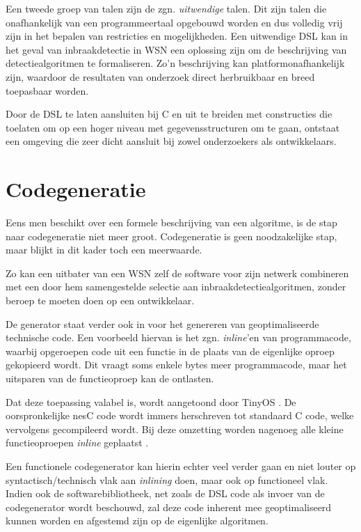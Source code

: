 Een tweede groep van talen zijn de zgn. \emph{uitwendige} talen. Dit zijn talen
die onafhankelijk van een programmeertaal opgebouwd worden en dus volledig vrij
zijn in het bepalen van restricties en mogelijkheden. Een uitwendige DSL kan in
het geval van inbraakdetectie in WSN een oplossing zijn om de beschrijving van
detectiealgoritmen te formaliseren. Zo'n beschrijving kan platformonafhankelijk
zijn, waardoor de resultaten van onderzoek direct herbruikbaar en breed
toepasbaar worden.

Door de DSL te laten aansluiten bij C en uit te breiden met constructies die
toelaten om op een hoger niveau met gegevensstructuren om te gaan, ontstaat een
omgeving die zeer dicht aansluit bij zowel onderzoekers als ontwikkelaars.

\vspace{-3mm}

\section{Codegeneratie}
\label{section:solution-codegen}

Eens men beschikt over een formele beschrijving van een algoritme, is de stap
naar codegeneratie niet meer groot. Codegeneratie is geen noodzakelijke stap,
maar blijkt in dit kader toch een meerwaarde.

Zo kan een uitbater van een WSN zelf de software voor zijn netwerk combineren
met een door hem samengestelde selectie aan inbraakdetectiealgoritmen, zonder
beroep te moeten doen op een ontwikkelaar.

De generator staat verder ook in voor het genereren van geoptimaliseerde
technische code. Een voorbeeld hiervan is het zgn. \emph{inline}'en van
programmacode, waarbij opgeroepen code uit een functie in de plaats van de
eigenlijke oproep gekopieerd wordt. Dit vraagt soms enkele bytes meer
programmacode, maar het uitsparen van de functieoproep kan de \mcu ontlasten.

Dat deze toepassing valabel is, wordt aangetoond door TinyOS
\citep{levis2005tinyos}. De oorspronkelijke nesC code wordt immers herschreven
tot standaard C code, welke vervolgens gecompileerd wordt. Bij deze omzetting
worden nagenoeg alle kleine functieoproepen \emph{inline} geplaatst
\citep{gay2007software}.

Een functionele codegenerator kan hierin echter veel verder gaan en niet louter
op syntactisch/technisch vlak aan \emph{inlining} doen, maar ook op functioneel
vlak. Indien ook de softwarebibliotheek, net zoals de DSL code als invoer van
de codegenerator wordt beschouwd, zal deze code inherent mee geoptimaliseerd
kunnen worden en afgestemd zijn op de eigenlijke algoritmen.

